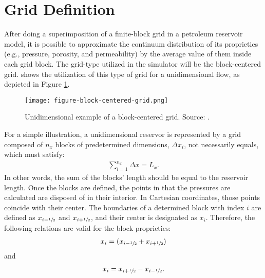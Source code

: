 \section{Grid Definition}
\label{section-grid-definition}

After doing a superimposition of a finite-block grid in a petroleum reservoir model, it is possible to approximate the continuum distribution of its proprieties (e.g., pressure, porosity, and permeability) by the average value of them inside each grid block.
%
The grid-type utilized in the simulator will be the block-centered grid.
%
\cite{Ertekin2001} shows the utilization of this type of grid for a unidimensional flow, as depicted in Figure \ref{figure-block-centered-grid}.
%
\begin{figure}[h]
	\centering
	\texttt{[image: figure-block-centered-grid.png]}\\
	\caption{Unidimensional example of a block-centered grid. Source: \cite{Ertekin2001}.}
	\label{figure-block-centered-grid}
\end{figure}
%
For a simple illustration, a unidimensional reservor is represented by a grid composed of $n_x$ blocks of predetermined dimensions, $\Delta x_i$, not necessarily equals, which must satisfy:
%
%
\begin{align}
	\label{equation-reservoir-length}
	\sum_{i=1}^{n_x}\Delta x=L_x.
\end{align}
%
In other words, the sum of the blocks' length should be equal to the reservoir length.
%
Once the blocks are defined, the points in that the pressures are calculated are disposed of in their interior.
%
In Cartesian coordinates, those points coincide with their center.
%
The boundaries of a determined block with index $i$ are defined as $x_{i-\sfrac{1}{2}}$ and $x_{i+\sfrac{1}{2}}$, and their center is designated as $x_i$.
%
Therefore, the following relations are valid for the block proprieties:
%
\begin{align}
	\label{equation-block-coordinate}
	x_i= (x_{i-\sfrac{1}{2}} + x_{i+\sfrac{1}{2}})
\end{align}
%
and
%
\begin{align}
	\label{equation-block-coordinate-rearranged}
	x_i= x_{i+\sfrac{1}{2}} - x_{i-\sfrac{1}{2}}.
\end{align}
